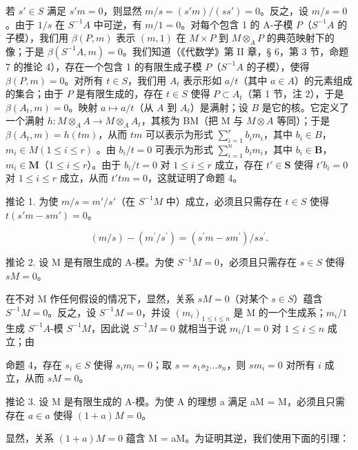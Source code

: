 若 \(s' \in S\) 满足 \(s'm = 0\)，则显然 \(m/s = (s'm)/(ss') = 0\)。反之，设 \(m/s = 0\)。由于 \(1/s\) 在 \(S^{-1}A\) 中可逆，有 \(m/1 = 0\)。对每个包含 1 的 A-子模 \(P\)（\(S^{-1}A\) 的子模），我们用 \(\beta(P, m)\) 表示 \((m, 1)\) 在 \(M \times P\) 到 \(M \otimes_A P\) 的典范映射下的像；于是 \(\beta(S^{-1}A, m) = 0\)。我们知道（《代数学》第 II 章，§ 6，第 3 节，命题 7 的推论 4），存在一个包含 1 的有限生成子模 \(P\)（\(S^{-1}A\) 的子模），使得 \(\beta(P, m) = 0\)。对所有 \(t \in S\)，我们用 \(A_t\) 表示形如 \(a/t\)（其中 \(a \in A\)）的元素组成的集合；由于 \(P\) 是有限生成的，存在 \(t \in S\) 使得 \(P \subset A_t\)（第 1 节，注 2），于是 \(\beta(A_t, m) = 0\)。映射 \(a \mapsto a/t\)（从 \(A\) 到 \(A_t\)）是满射；设 \(B\) 是它的核。它定义了一个满射 \(h: M \otimes_A A \to M \otimes_A A_t\)，其核为 BM（把 M 与 \(M \otimes A\) 等同）；于是 \(\beta(A_t, m) = h(tm)\)，从而 \(tm\) 可以表示为形式 \(\sum_{i=1}^{r} b_i m_i\)，其中 \(b_i \in B\)，\(m_i \in M (1 \leqslant i \leqslant r)\) 。由 \(b_i/t = 0\) 可表示为形式 \(\sum_{i=1}^{n} b_i m_i\)，其中 \(b_i \in \mathbf{B}\)，\(m_i \in \mathbf{M}\)（\(1 \leqslant i \leqslant r\)）。由于 \(b_i / t = 0\) 对 \(1 \leqslant i \leqslant r\) 成立，存在 \(t' \in \mathbf{S}\) 使得 \(t'b_i = 0\) 对 \(1 \leqslant i \leqslant r\) 成立，从而 \(t'tm = 0\)，这就证明了命题 4。

推论 1. 为使 \(m / s = m' / s'\)（在 \(S^{-1}M\) 中）成立，必须且只需存在 \(t \in S\) 使得 \(t(s'm - sm') = 0\)。

\[
(m / s) - (m ^ {\prime} / s ^ {\prime}) = (s ^ {\prime} m - s m ^ {\prime}) / s s ^ {\prime}.
\]

推论 2. 设 M 是有限生成的 A-模。为使 \(S^{-1}M = 0\)，必须且只需存在 \(s \in S\) 使得 \(sM = 0\)。

在不对 M 作任何假设的情况下，显然，关系 \(sM = 0\)（对某个 \(s \in S\)）蕴含 \(S^{-1}M = 0\)。反之，设 \(S^{-1}M = 0\)，并设 \((m_i)_{1 \leqslant i \leqslant n}\) 是 M 的一个生成系；\(m_i / 1\) 生成 \(S^{-1}A\)-模 \(S^{-1}M\)，因此说 \(S^{-1}M = 0\) 就相当于说 \(m_i / 1 = 0\) 对 \(1 \leqslant i \leqslant n\) 成立；由

命题 4，存在 \(s_i \in S\) 使得 \(s_i m_i = 0\)；取 \(s = s_1 s_2 \ldots s_n\)，则 \(sm_i = 0\) 对所有 \(i\) 成立，从而 \(sM = 0\)。

推论 3. 设 M 是有限生成的 A-模。为使 A 的理想 a 满足 aM = M，必须且只需存在 \(a \in a\) 使得 \((1 + a)M = 0\)。

显然，关系 \((1 + a)M = 0\) 蕴含 M = aM。为证明其逆，我们使用下面的引理：

